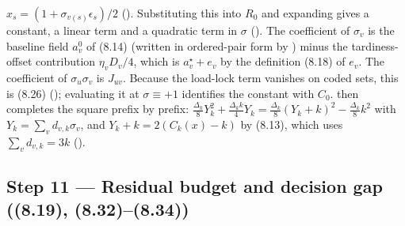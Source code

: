 \documentclass[11pt]{article}
\begin{document}
$x_s=(1+\sigma_{v(s)}\epsilon_s)/2$ (). Substituting this into $R_0$ and
expanding gives a constant, a linear term and a quadratic term in $\sigma$ ().
The coefficient of $\sigma_v$ is the baseline field $a^0_v$ of (8.14) (written in ordered-pair
form by ) minus the tardiness-offset contribution $\eta_vD_v/4$, which is
$a^\star_v+e_v$ by the definition (8.18) of $e_v$. The coefficient of $\sigma_u\sigma_v$ is
$J_{uv}$. Because the load-lock term vanishes on coded sets, this is (8.26)
(); evaluating it at $\sigma\equiv+1$ identifies the constant with
$C_0$.  then completes the square prefix by prefix:
$\frac{\Delta_k}8Y_k^2+\frac{\Delta_kk}4Y_k=\frac{\Delta_k}8(Y_k+k)^2-\frac{\Delta_k}8k^2$ with
$Y_k=\sum_vd_{v,k}\sigma_v$, and $Y_k+k=2(C_k(x)-k)$ by (8.13), which uses
$\sum_vd_{v,k}=3k$ ().

\subsection{Step 11 --- Residual budget and decision gap ((8.19), (8.32)--(8.34))}\label{step:gap}
\end{document}
